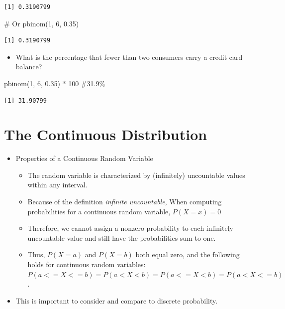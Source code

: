 \documentclass[
  letterpaper,
  DIV=11,
  numbers=noendperiod]{scrreprt}
\newenvironment{Shaded}{\begin{snugshade}}{\end{snugshade}}
\newcommand{\CommentTok}[1]{\textcolor[rgb]{0.37,0.37,0.37}{#1}}
\newcommand{\DecValTok}[1]{\textcolor[rgb]{0.68,0.00,0.00}{#1}}
\newcommand{\FloatTok}[1]{\textcolor[rgb]{0.68,0.00,0.00}{#1}}
\newcommand{\FunctionTok}[1]{\textcolor[rgb]{0.28,0.35,0.67}{#1}}
\newcommand{\NormalTok}[1]{\textcolor[rgb]{0.00,0.23,0.31}{#1}}
\newcommand{\SpecialCharTok}[1]{\textcolor[rgb]{0.37,0.37,0.37}{#1}}
\providecommand{\tightlist}{%
  \setlength{\itemsep}{0pt}\setlength{\parskip}{0pt}}\usepackage{longtable,booktabs,array}
\begin{document}
\begin{verbatim}
[1] 0.3190799
\end{verbatim}

\begin{Shaded}
\begin{Highlighting}[]
\CommentTok{\# Or}
\FunctionTok{pbinom}\NormalTok{(}\DecValTok{1}\NormalTok{, }\DecValTok{6}\NormalTok{, }\FloatTok{0.35}\NormalTok{)}
\end{Highlighting}
\end{Shaded}

\begin{verbatim}
[1] 0.3190799
\end{verbatim}

\begin{itemize}
\tightlist
\item
  What is the percentage that fewer than two consumers carry a credit
  card balance?
\end{itemize}

\begin{Shaded}
\begin{Highlighting}[]
\FunctionTok{pbinom}\NormalTok{(}\DecValTok{1}\NormalTok{, }\DecValTok{6}\NormalTok{, }\FloatTok{0.35}\NormalTok{) }\SpecialCharTok{*} \DecValTok{100}  \CommentTok{\#31.9\%}
\end{Highlighting}
\end{Shaded}

\begin{verbatim}
[1] 31.90799
\end{verbatim}


\chapter{The Continuous Distribution}\label{the-continuous-distribution}

\begin{itemize}
\tightlist
\item
  Properties of a Continuous Random Variable

  \begin{itemize}
  \tightlist
  \item
    The random variable is characterized by (infinitely) uncountable
    values within any interval.
  \item
    Because of the definition \emph{infinite uncountable}, When
    computing probabilities for a continuous random variable,
    \(P(X=x)=0\)
  \item
    Therefore, we cannot assign a nonzero probability to each infinitely
    uncountable value and still have the probabilities sum to one.
  \item
    Thus, \(P(X=a)\) and \(P(X=b)\) both equal zero, and the following
    holds for continuous random variables:
    \(P(a <= X <= b) = P(a < X < b) = P(a <= X < b) = P(a < X <= b)\).
  \end{itemize}
\item
  This is important to consider and compare to discrete probability.
\end{itemize}
\end{document}
